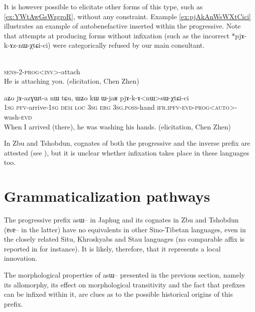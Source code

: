 \documentclass[oldfontcommands,oneside,a4paper,11pt]{article}
\newcommand{\ipa}[1]{{\phon \mbox{#1}}} %
\begin{document}
It is however possible to elicitate other forms of this type, such as \ref{ex:YWtAwGsWzgroR}, without any constraint. Example \ref{ex:pjAkAnWsWXtCici} illustrates an example of autobenefactive inserted within the progressive. Note that attempts at producing forms without infixation (such as the incorrect *\ipa{pjɤ-k-ɤz-nɯ-χtɕi-ci}) were categorically refused by our main consultant.

\begin{exe}
\ex  \label{ex:YWtAwGsWzgroR}
\gll  \ipa{ɲɯ-tɯ-ɤ́<wɣ>sɯ-zgroʁ}    \\
\textsc{sens-2-prog<inv>}-attach \\
\glt He is attaching you. (elicitation, Chen Zhen)
\end{exe}

\begin{exe}
\ex  \label{ex:pjAkAnWsWXtCici}
\gll
\ipa{aʑo}  	\ipa{jɤ-azɣɯt-a}  	\ipa{nɯ} \ipa{tɕu,}  	\ipa{ɯʑo}  	\ipa{kɯ}  	\ipa{ɯ-jaʁ}  	\ipa{pjɤ-k-ɤ<nɯ>sɯ-χtɕi-ci}  \\
 \textsc{1sg} \textsc{pfv}-arrive-\textsc{1sg} \textsc{dem} \textsc{loc} \textsc{3sg} \textsc{erg} \textsc{3sg.poss}-hand \textsc{ifr.ipfv-evd-prog<auto>}-wash-\textsc{evd} \\
\glt When I arrived (there), he was washing his hands. (elicitation, Chen Zhen)
\end{exe}
In Zbu and Tshobdun, cognates of both the progressive and the inverse prefix are attested (see \citealt{jackson02rentongdengdi, gongxun14agreement}), but it is unclear whether infixation takes place in these languages too.
 

\section{Grammaticalization pathways}
The progressive prefix \ipa{asɯ--} in Japhug and its cognates in Zbu and Tshobdun (\ipa{ɐsɐ--} in the latter) have no equivalents in other Sino-Tibetan languages, even in the closely related Situ, Khroskyabs and Stau languages (no comparable affix is reported in \citealt{linxr93jiarong, prins11kyomkyo, huangbf07lavrung, lai13affixale} for instance). It is likely, therefore, that it represents a local innovation.

The morphological properties of \ipa{asɯ--} presented in the previous section, namely its allomorphy, its effect on morphological transitivity and the fact that prefixes can be infixed within it, are clues as to the possible historical origins of this prefix.
\end{document}
